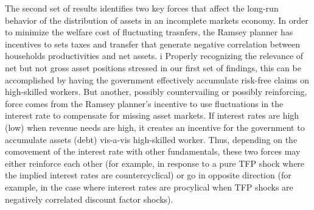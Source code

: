 \documentclass[thmsb,11pt]{article}
\begin{document}
The second set of results identifies two key forces  that affect the  long-run behavior of the distribution of assets in
an  incomplete markets economy. In order to minimize the welfare cost of fluctuating trasnfers, the Ramsey planner has incentives to sets taxes and transfer that generate negative correlation between households productivities and net assets.
i%
Properly recognizing the relevance  of net but not gross asset positions stressed in
our first set of findings, this  can be accomplished by having the  government  effectively accumulate risk-free claims on high-skilled workers.
But another, possibly countervailing or possibly reinforcing,  force  comes from the Ramsey planner's incentive to  use fluctuations in the  interest rate to compensate for missing asset markets. If interest rates are high (low) when revenue needs are high, it creates an incentive  for the government to accumulate assets (debt) vis-a-vis high-skilled worker.
Thus, depending on the comovement of the interest rate with other fundamentals, these two forces  may either reinforce each other (for example, in response to  a pure TFP shock where the implied interest rates are countercyclical) or go in  opposite direction (for example,
in the case where interest rates are procylical when TFP shocks are negatively correlated discount factor shocks).
\end{document}
